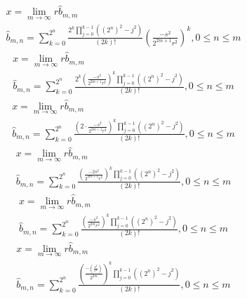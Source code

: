 \documentclass[a4paper,12pt]{report}
\begin{document}
\begin{subequations}
\begin{gather}
x = \lim \limits_{m \to \infty} r \hat{b}_{m,m} \\
\hat{b}_{m,n} = \sum \limits_{k=0}^{2^n} \frac{2^{k} \prod \limits_{j=0}^{k-1} ((2^n)^2 - j^2)}{(2k)!} \left(\frac{-s^2}{2^{2m+1}r^2}\right)^k, 0 \leq n \leq m
\end{gather}
\end{subequations}
\begin{subequations}
\begin{gather}
x = \lim \limits_{m \to \infty} r \hat{b}_{m,m} \\
\hat{b}_{m,n} = \sum \limits_{k=0}^{2^n} \frac{2^{k} \left(\frac{-s^2}{2^{2m+1}r^2}\right)^k \prod \limits_{j=0}^{k-1} ((2^n)^2 - j^2)}{(2k)!}, 0 \leq n \leq m
\end{gather}
\end{subequations}
\begin{subequations}
\begin{gather}
x = \lim \limits_{m \to \infty} r \hat{b}_{m,m} \\
\hat{b}_{m,n} = \sum \limits_{k=0}^{2^n} \frac{\left(2 \cdot \frac{-s^2}{2^{2m+1}r^2}\right)^k \prod \limits_{j=0}^{k-1} ((2^n)^2 - j^2)}{(2k)!}, 0 \leq n \leq m
\end{gather}
\end{subequations}
\begin{subequations}
\begin{gather}
x = \lim \limits_{m \to \infty} r \hat{b}_{m,m} \\
\hat{b}_{m,n} = \sum \limits_{k=0}^{2^n} \frac{\left(\frac{-2s^2}{2^{2m+1}r^2}\right)^k \prod \limits_{j=0}^{k-1} ((2^n)^2 - j^2)}{(2k)!}, 0 \leq n \leq m
\end{gather}
\end{subequations}
\begin{subequations}
\begin{gather}
x = \lim \limits_{m \to \infty} r \hat{b}_{m,m} \\
\hat{b}_{m,n} = \sum \limits_{k=0}^{2^n} \frac{\left(\frac{-s^2}{2^{2m}r^2}\right)^k \prod \limits_{j=0}^{k-1} ((2^n)^2 - j^2)}{(2k)!}, 0 \leq n \leq m
\end{gather}
\end{subequations}
\begin{subequations}
\begin{gather}
x = \lim \limits_{m \to \infty} r \hat{b}_{m,m} \\
\hat{b}_{m,n} = \sum \limits_{k=0}^{2^n} \frac{\left(\frac{-\left(\frac{s^2}{r^2}\right)}{2^{2m}}\right)^k \prod \limits_{j=0}^{k-1} ((2^n)^2 - j^2)}{(2k)!}, 0 \leq n \leq m
\end{gather}
\end{subequations}
\end{document}
